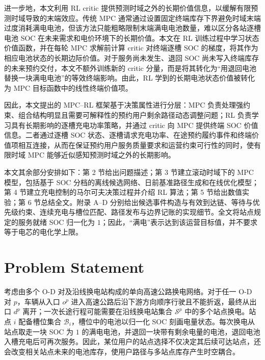 \documentclass[12pt,a4paper,UTF8]{ctexart}
\begin{document}
进一步地，本文利用 RL critic 提供预测时域之外的长期价值信息，以缓解有限预测时域导致的末端效应。传统 MPC 通常通过设置固定终端库存下界避免时域末端过度消耗满电电池，但该方法只能粗略限制末端满电电池数量，难以区分各站逐槽电池 SOC 在未来需求和电价环境下的长期价值。本文在 RL 训练过程中学习状态价值函数，并在每轮 MPC 求解前计算 critic 对终端逐槽 SOC 的梯度，将其作为相应电池状态的长期边际价值。对于服务尚未发生、退回 SOC 尚未写入终端库存的未来预约交付，本文不额外训练新的 critic 分量，而是将其转化为“用退回电池替换一块满电电池”的等效终端影响。由此，RL 学到的长期电池状态价值被转化为 MPC 目标函数中的线性终端价值项。

因此，本文提出的 MPC--RL 框架基于决策属性进行分层：MPC 负责处理强约束、组合结构明显且需要可解释性的预约用户剩余路径动态调整问题；RL 负责学习具有长期影响的逐槽充电功率策略，并通过 critic 向 MPC 提供终端 SOC 价值信息。二者通过逐槽 SOC 状态、逐槽请求充电功率、在途预约履约事件和终端价值项相互连接，从而在保证预约用户服务质量要求和运营约束可行性的同时，使有限时域 MPC 能够近似感知预测时域之外的长期影响。


本文其余部分安排如下：第 2 节给出问题描述；第 3 节建立滚动时域下的 MPC 模型，包括基于 SOC 分档的离线候选网络、日前基准路径生成和在线优化模型；第 4 节建立充电控制的马尔可夫决策过程并介绍 RL 算法；第 5 节给出数值实验；第 6 节总结全文。附录 A--D 分别给出候选事件构造与有效到达链、等待与优先级约束、连续充电与槽位匹配、路径发布与边界记账的实现细节。全文将站点规定的服务就绪 SOC 归一化为 $1$；因此，“满电”表示达到该运营目标值，并不要求等于电芯的电化学上限。






\section{Problem Statement}

考虑由多个 O-D 对及沿线换电站构成的单向高速公路换电网络。对于任一 O-D 对 $p$，车辆从入口 $o^p$ 进入高速公路后沿下游方向顺序行驶且不能折返，最终从出口 $d^p$ 离开；一次长途行程可能需要在沿线换电站集合 $\mathcal S^p$ 中的多个站点换电。站点 $i$ 配备槽位集合 $\mathcal B_i$，槽位中的电池以归一化 SOC 刻画电量状态。每次换电从站点取走一块 SOC 为 $1$ 的满电电池，并退回一块带有剩余电量的电池，退回电池入槽充电后可再次服务。因此，某位用户的站点选择不仅决定其后续可达站点，还会改变相关站点未来的电池库存，使用户路径与多站点库存产生时空耦合。
\end{document}
